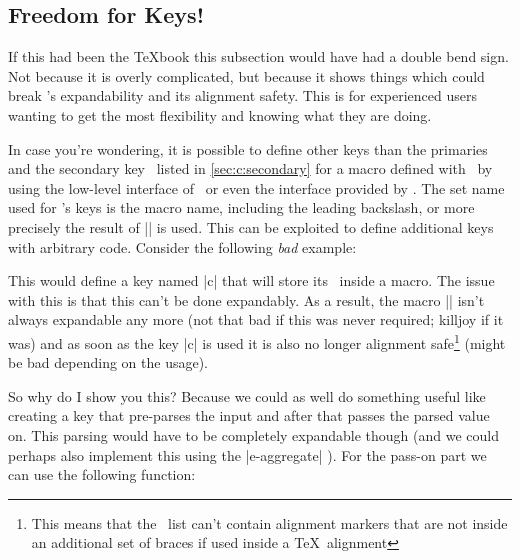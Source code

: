 \subsection{Freedom for Keys!}

If this had been the \TeX{}book this subsection would have had a double bend
sign. Not because it is overly complicated, but because it shows things which
could break \expkvc's expandability and its alignment safety. This is for
experienced users wanting to get the most flexibility and knowing what they are
doing.

In case you're wondering, it is possible to define other keys than the primaries
and the secondary key \types\ listed in \autoref{sec:c:secondary} for a
macro defined with \expkvc\ by using the low-level interface of \expkv\ or even
the interface provided by \expkvd. The set name used for \expkvc's keys is the
macro name, including the leading backslash, or more precisely the result of
|\string| is used. This can be exploited to define additional keys with
arbitrary code. Consider the following \emph{bad} example:
\begin{enverb}[no-tcb]
  \ekvcSplit{}
  \protected{}
\end{enverb}
This would define a key named |c| that will store its \val\ inside a macro. The
issue with this is that this can't be done expandably. As a result, the macro
|\foo| isn't always expandable any more (not that bad if this was never
required; killjoy if it was) and as soon as the key |c| is used it is also no
longer alignment safe\footnote{This means that the \kv\ list can't contain
  alignment markers that are not inside an additional set of braces if used
  inside a \TeX\ alignment}
(might be bad depending on the usage).

So why do I show you this? Because we could as well do something useful like
creating a key that pre-parses the input and after that passes the parsed value
on. This parsing would have to be completely expandable though (and we could
perhaps also implement this using the |e-aggregate| \type). For the
pass-on part we can use the following function:

